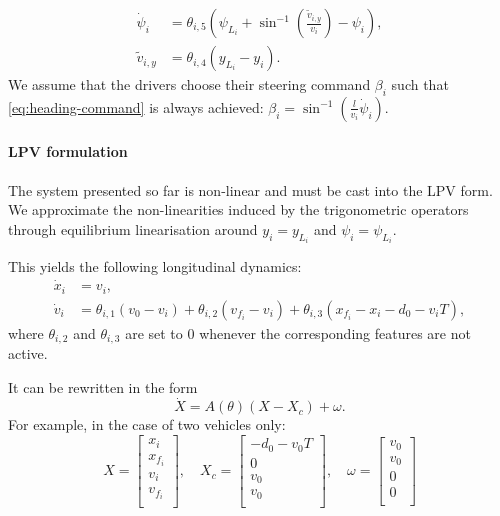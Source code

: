 \documentclass{article}
\begin{document}
\begin{align}
\label{eq:heading-command}
\dot{\psi}_i &= \theta_{i,5}\left(\psi_{L_i}+\sin^{-1}\left(\frac{\tilde{v}_{i,y}}{v_i}\right)-\psi_i\right),\\
\tilde{v}_{i,y} &= \theta_{i,4} (y_{L_i}-y_i). \nonumber
\end{align}
We assume that the drivers choose their steering command $\beta_i$ such that \eqref{eq:heading-command} is always achieved: $\beta_i = \sin^{-1}(\frac{l}{v_i}\dot{\psi}_i)$.

\paragraph{LPV formulation}

The system presented so far is non-linear and must be cast into the LPV form. We approximate the non-linearities induced by the trigonometric operators through equilibrium linearisation around $y_i=y_{L_i}$ and $\psi_i=\psi_{L_i}$.

This yields the following longitudinal dynamics:
\begin{align*}
\dot{x}_i &= v_i,\\
\dot v_i &= \theta_{i,1} (v_0 - v_i) + \theta_{i,2} (v_{f_i} - v_i) + \theta_{i,3}(x_{f_i} - x_i - d_0 - v_i T),
\end{align*}
where $\theta_{i,2}$ and $\theta_{i,3}$ are set to $0$ whenever the corresponding features are not active.

It can be rewritten in the form $$\dot{X} = A(\theta)(X-X_c) + \omega.$$ For example, in the case of two vehicles only:
\begin{equation*}
X = \begin{bmatrix}
x_i \\
x_{f_i} \\
v_i \\
v_{f_i} \\
\end{bmatrix}
,\quad
X_c = \begin{bmatrix}
-d_0-v_0 T \\
0 \\
v_0\\
v_0 \\
\end{bmatrix}
,\quad
\omega = \begin{bmatrix}
v_0 \\
v_0 \\
0\\
0\\
\end{bmatrix}
\end{equation*}
\end{document}
